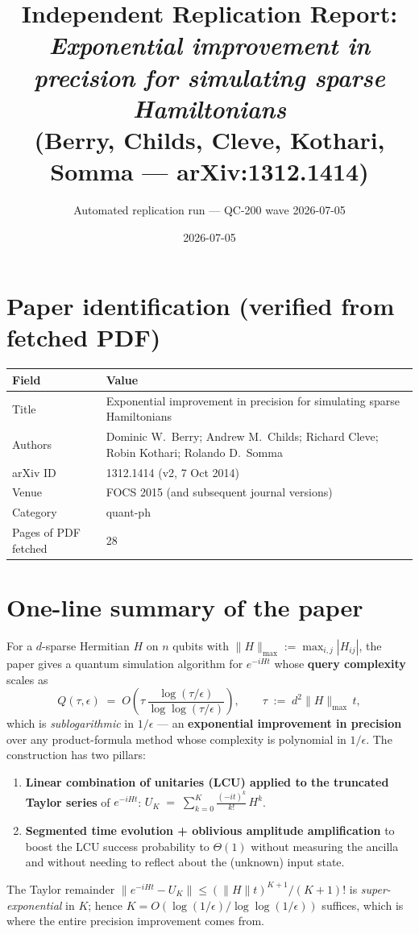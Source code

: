 \documentclass[11pt]{article}
\title{Independent Replication Report:\\
\textit{Exponential improvement in precision for simulating sparse Hamiltonians}\\
\normalsize (Berry, Childs, Cleve, Kothari, Somma --- arXiv:1312.1414)}
\author{Automated replication run --- QC-200 wave 2026-07-05}
\date{2026-07-05}
\begin{document}
\maketitle

\section{Paper identification (verified from fetched PDF)}
\begin{tabular}{ll}
\toprule
Field & Value \\
\midrule
Title & Exponential improvement in precision for simulating sparse Hamiltonians \\
Authors & Dominic W.\ Berry; Andrew M.\ Childs; Richard Cleve; Robin Kothari; Rolando D.\ Somma \\
arXiv ID & 1312.1414 (v2, 7 Oct 2014) \\
Venue & FOCS 2015 (and subsequent journal versions) \\
Category & quant-ph \\
Pages of PDF fetched & 28 \\
\bottomrule
\end{tabular}

\section{One-line summary of the paper}
For a $d$-sparse Hermitian $H$ on $n$ qubits with $\|H\|_{\max}\!:=\!\max_{i,j}\!|H_{ij}|$, the paper gives a quantum simulation algorithm for $e^{-iHt}$ whose \textbf{query complexity} scales as
\[
Q(\tau,\epsilon) \;=\; O\!\left(\tau\,\frac{\log(\tau/\epsilon)}{\log\log(\tau/\epsilon)}\right),
\qquad
\tau \;:=\; d^2 \|H\|_{\max}\, t,
\]
which is \emph{sublogarithmic} in $1/\epsilon$ --- an \textbf{exponential improvement in precision} over any product-formula method whose complexity is polynomial in $1/\epsilon$. The construction has two pillars:
\begin{enumerate}
\item \textbf{Linear combination of unitaries (LCU) applied to the truncated Taylor series} of $e^{-iHt}$: $U_K \;=\; \sum_{k=0}^{K} \frac{(-it)^k}{k!}\, H^k$.
\item \textbf{Segmented time evolution + oblivious amplitude amplification} to boost the LCU success probability to $\Theta(1)$ without measuring the ancilla and without needing to reflect about the (unknown) input state.
\end{enumerate}
The Taylor remainder $\|e^{-iHt}-U_K\|\le (\|H\|t)^{K+1}/(K+1)!$ is \emph{super-exponential} in $K$; hence $K = O(\log(1/\epsilon)/\log\log(1/\epsilon))$ suffices, which is where the entire precision improvement comes from.
\end{document}
